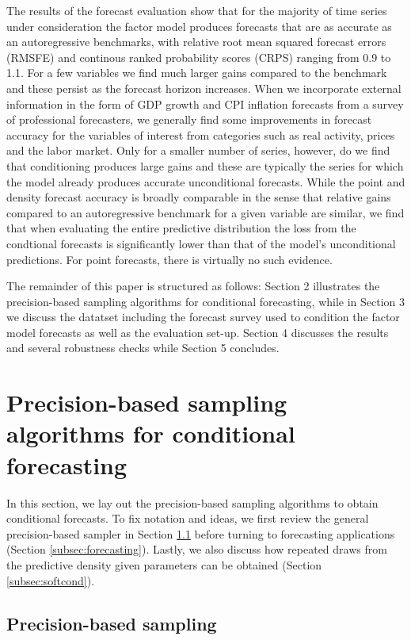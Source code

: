 \documentclass[notitlepage,a4paper,12pt]{article}
\begin{document}
The results of the forecast evaluation show that for the majority of time series under consideration the factor model produces forecasts that are as accurate as an autoregressive benchmarks, with relative root mean squared forecast errors (RMSFE) and continous ranked probability scores (CRPS) ranging from 0.9 to 1.1. For a few variables we find much larger gains compared to the benchmark and these persist as the forecast horizon increases. When we incorporate external information in the form of GDP growth and CPI inflation forecasts from a survey of professional forecasters, we generally find some improvements in forecast accuracy for the variables of interest from categories such as real activity, prices and the labor market. Only for a smaller number of series, however, do we find that conditioning produces large gains and these are typically the series for which the model already produces accurate unconditional forecasts. While the point and density forecast accuracy is broadly comparable in the sense that relative gains compared to an autoregressive benchmark for a given variable are similar, we find that when evaluating the entire predictive distribution the loss from the condtional forecasts is significantly lower than that of the model's unconditional predictions. For point forecasts, there is virtually no such evidence.

The remainder of this paper is structured as follows: Section 2 illustrates the precision-based sampling algorithms for conditional forecasting, while in Section 3 we discuss the datatset including the forecast survey used to condition the factor model forecasts as well as the evaluation set-up. Section 4 discusses the results and several robustness checks while Section 5 concludes.

\section{Precision-based sampling algorithms for conditional forecasting}\label{sec:precsampler}

In this section, we lay out the precision-based sampling algorithms to obtain conditional forecasts. To fix notation and ideas, we first review the general precision-based sampler in Section \ref{subsec:precsampler} before turning to forecasting applications (Section \ref{subsec:forecasting}). Lastly, we also discuss how repeated draws from the predictive density given parameters can be obtained (Section \ref{subsec:softcond}). 

\subsection{Precision-based sampling}\label{subsec:precsampler}
\end{document}

